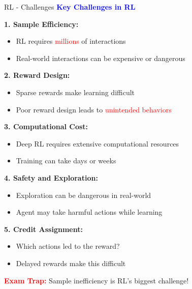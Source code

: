 \documentclass[8pt]{beamer}
\begin{document}
\begin{frame}{RL - Challenges}
\fontsize{6.5}{7.5}\selectfont
\textcolor{blue}{\textbf{Key Challenges in RL}}

\textbf{1. Sample Efficiency:}
\begin{itemize}
\item RL requires \textcolor{red}{millions} of interactions
\item Real-world interactions can be expensive or dangerous
\end{itemize}

\textbf{2. Reward Design:}
\begin{itemize}
\item Sparse rewards make learning difficult
\item Poor reward design leads to \textcolor{red}{unintended behaviors}
\end{itemize}

\textbf{3. Computational Cost:}
\begin{itemize}
\item Deep RL requires extensive computational resources
\item Training can take days or weeks
\end{itemize}

\textbf{4. Safety and Exploration:}
\begin{itemize}
\item Exploration can be dangerous in real-world
\item Agent may take harmful actions while learning
\end{itemize}

\textbf{5. Credit Assignment:}
\begin{itemize}
\item Which actions led to the reward?
\item Delayed rewards make this difficult
\end{itemize}

\textcolor{red}{\textbf{Exam Trap:}} Sample inefficiency is RL's biggest challenge!
\end{frame}
\end{document}

